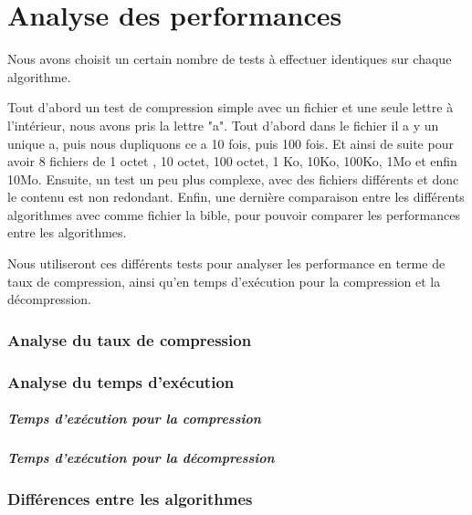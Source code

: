 \documentclass{report}
\begin{document}
\part{Analyse des performances}
Nous avons choisit un certain nombre de tests à effectuer identiques sur chaque algorithme.

Tout d'abord un test de compression simple avec un fichier et une seule lettre à l'intérieur, nous avons pris la lettre "a".
Tout d'abord dans le fichier il a y un unique a, puis nous dupliquons ce a 10 fois, puis 100 fois. Et ainsi de suite pour avoir 8 fichiers de 1 octet , 10 octet, 100 octet, 1 Ko, 10Ko, 100Ko, 1Mo et enfin 10Mo. 
Ensuite, un test un peu plus complexe, avec des fichiers différents et donc le contenu est non redondant.
Enfin, une dernière comparaison entre les différents algorithmes avec comme fichier la bible, pour pouvoir comparer les performances entre les algorithmes.

Nous utiliseront ces différents tests pour analyser les performance en terme de taux de compression, ainsi qu'en temps d’exécution pour la compression et la décompression. 
\section*{Analyse du taux de compression}

\section*{Analyse du temps d’exécution}
\subsubsection*{Temps d’exécution pour la compression}
\subsubsection*{Temps d’exécution pour la décompression}


\section*{Différences entre les algorithmes}
\end{document}
